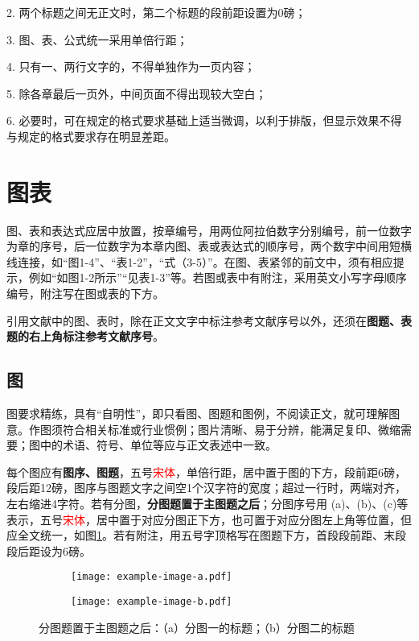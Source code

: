2. 两个标题之间无正文时，第二个标题的段前距设置为0磅；

3. 图、表、公式统一采用单倍行距；

4. 只有一、两行文字的，不得单独作为一页内容；

5. 除各章最后一页外，中间页面不得出现较大空白；

6. 必要时，可在规定的格式要求基础上适当微调，以利于排版，但显示效果不得与规定的格式要求存在明显差距。

\section{图表}

图、表和表达式应居中放置，按章编号，用两位阿拉伯数字分别编号，前一位数字为章的序号，后一位数字为本章内图、表或表达式的顺序号，两个数字中间用短横线连接，如“图1-4”、“表1-2”，“式（3-5）”。在图、表紧邻的前文中，须有相应提示，例如“如图1-2所示”“见表1-3”等。若图或表中有附注，采用英文小写字母顺序编号，附注写在图或表的下方。

引用文献中的图、表时，除在正文文字中标注参考文献序号以外，还须在\textbf{图题、表题的右上角标注参考文献序号}。

\subsection{图}\label{sec2.4.1}

图要求精练，具有“自明性”，即只看图、图题和图例，不阅读正文，就可理解图意。作图须符合相关标准或行业惯例；图片清晰、易于分辨，能满足复印、微缩需要；图中的术语、符号、单位等应与正文表述中一致。

每个图应有\textbf{图序、图题}，五号\textcolor{red}{宋体}，单倍行距，居中置于图的下方，段前距6磅，段后距12磅，图序与图题文字之间空1个汉字符的宽度；超过一行时，两端对齐，左右缩进4字符。若有分图，\textbf{分图题置于主图题之后}；分图序号用 (a)、(b)、(c)等表示，五号\textcolor{red}{宋体}，居中置于对应分图正下方，也可置于对应分图左上角等位置，但应全文统一，如图\ref{fig:有分图的情况的示例}。若有附注，用五号字顶格写在图题下方，首段段前距、末段段后距设为6磅。

\begin{figure}[!ht]  
    \centering
    \begin{subfigure}[t]{0.45\textwidth}
        \centering
        \texttt{[image: example-image-a.pdf]}
        \caption{}
    \end{subfigure}
    \quad
    \begin{subfigure}[t]{0.45\textwidth}
        \centering
        \texttt{[image: example-image-b.pdf]}
        \caption{}
    \end{subfigure}
    \caption{分图题置于主图题之后：（a）分图一的标题；（b）分图二的标题}
    \label{fig:有分图的情况的示例}
\end{figure}

